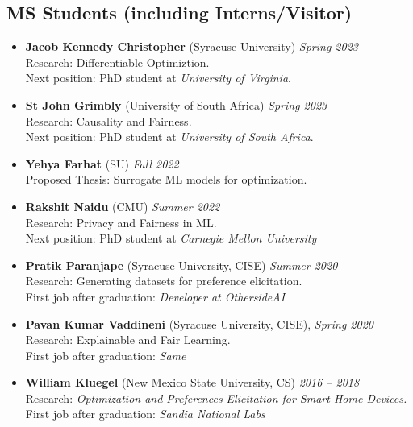 \subsection*{MS Students (including Interns/Visitor)}
\begin{itemize}
  \item \textbf{Jacob Kennedy Christopher} ({\sc Syracuse University}) \hfill{\em Spring 2023}\\
  {\sc Research:} Differentiable Optimiztion.\\
  {\sc Next position:} PhD student at \textit{University of Virginia}.

  \item \textbf{St John Grimbly} ({\sc University of South Africa}) \hfill{\em Spring 2023}\\
  {\sc Research:} Causality and Fairness.\\
  {\sc Next position:} PhD student at \textit{University of South Africa}.

  \item \textbf{Yehya Farhat} ({\sc SU}) \hfill{\em Fall 2022}\\
  {\sc Proposed Thesis:} Surrogate ML models for optimization.

  \item \textbf{Rakshit Naidu} ({\sc CMU}) \hfill{\em Summer 2022}\\
  {\sc Research:} Privacy and Fairness in ML.\\
  {\sc Next position:} PhD student at \textit{Carnegie Mellon University}



  \item \textbf{Pratik Paranjape} ({\sc Syracuse University}, CISE) 
  \hfill{\em Summer 2020}\\
  {\sc Research}: Generating datasets for preference elicitation.\\
  First job after graduation: \textit{Developer at OthersideAI}

  \item \textbf{Pavan Kumar Vaddineni}  ({\sc Syracuse University}, CISE), \hfill{\em Spring 2020}\\
  {\sc Research}: Explainable and Fair Learning.\\
  First job after graduation: \textit{Same}

  \item \textbf{William Kluegel} (New Mexico State University, CS) \hfill{\em 2016 -- 2018} \\
  {\sc Research}: \textit{Optimization and Preferences Elicitation for Smart Home Devices.}\\
  First job after graduation: \textit{Sandia National Labs}
\end{itemize}
\medskip

